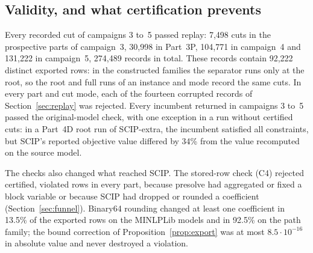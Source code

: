 \subsection{Validity, and what certification prevents}\label{sec:validity}

Every recorded cut of campaigns 3 to~5 passed replay: 7{,}498 cuts in the
prospective parts of campaign~3, 30{,}998 in Part~3P, 104{,}771 in campaign~4
and 131{,}222 in campaign~5, 274{,}489 records in total. These records contain
92{,}222 distinct exported rows: in the constructed families the
separator runs only at the root, so the root and full runs of an instance and
mode record the same cuts. In every part and cut mode, each of the fourteen
corrupted records of Section~\ref{sec:replay} was rejected. Every incumbent
returned in campaigns 3 to~5 passed the original-model check, with one
exception in a run without certified cuts: in a Part~4D root run of
SCIP-extra, the incumbent satisfied all constraints, but SCIP's reported
objective value differed by 34\% from the value recomputed on the source model.

The checks also changed what reached SCIP. The stored-row check (C4) rejected
certified, violated rows in every part, because presolve had aggregated or
fixed a block variable or because SCIP had dropped or rounded a coefficient
(Section~\ref{sec:funnel}). Binary64 rounding changed at least one coefficient
in 13.5\% of the exported rows on the MINLPLib models and in 92.5\% on the path
family; the bound correction of Proposition~\ref{prop:export} was at most
$8.5\cdot10^{-16}$ in absolute value and never destroyed a violation.

